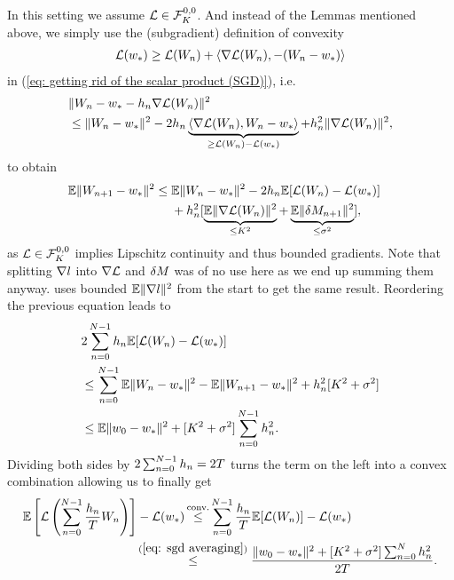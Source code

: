 In this setting we assume \(\Loss \in \lipGradientSet[0,0]{\lipConst}\).
And instead of the Lemmas mentioned above, we simply use the
(subgradient) definition of convexity
\begin{align*}
	\Loss(\minimum)
	\ge \Loss(\Weights_n) + 
	\langle\nabla\Loss(\Weights_n), -(\Weights_n - \minimum)\rangle
\end{align*}
in (\ref{eq: getting rid of the scalar product (SGD)}), i.e.
\begin{align*}
	&\|\Weights_n - \minimum - \lr_n\nabla\Loss(\Weights_n)\|^2\\
	&\le \|\Weights_n - \minimum\|^2
	- 2\lr_n\underbrace{\langle\nabla\Loss(\Weights_n), \Weights_n-\minimum\rangle}_{
		\ge \Loss(\Weights_n) - \Loss(\minimum)
	}
	+ \lr_n^2 \|\nabla\Loss(\Weights_n)\|^2,
\end{align*}
to obtain
\begin{align*}
	\E\|\Weights_{n+1}-\minimum\|^2
	&\le
	\begin{aligned}[t]
		&\E\|\Weights_n -\minimum\|^2
		- 2\lr_n \E[\Loss(\Weights_n) - \Loss(\minimum)]\\
		&+ \lr_n^2 [
			\underbrace{\E\|\nabla\Loss(\Weights_n)\|^2}_{\le \lipConst^2}
			+ \underbrace{\E\|\martIncr_{n+1}\|^2}_{\le \stdBound^2}
		],
	\end{aligned}
\end{align*}
as \(\Loss\in\lipGradientSet[0,0]{\lipConst}\) implies Lipschitz continuity and thus bounded
gradients. Note that splitting \(\nabla\loss\) into \(\nabla\Loss\) and \(\martIncr\)
was of no use here as we end up summing them anyway. \textcite{nemirovskiRobustStochasticApproximation2009}
uses bounded \(\E\|\nabla\loss\|^2\) from the start to get the same result.
Reordering the previous equation leads to
\begin{align}
	\nonumber
	&2\sum_{n=0}^{N-1} \lr_n\E[\Loss(\Weights_n)-\Loss(\minimum)]\\
	\nonumber
	&\le \sum_{n=0}^{N-1} \E\|\Weights_n -\minimum\|^2 - \E\|\Weights_{n+1}-\minimum\|^2
	+ \lr_n^2 [\lipConst^2 + \stdBound^2]\\
	\label{eq: sgd averaging}
	&\le \E\|\weights_0 - \minimum\|^2 + [\lipConst^2+\stdBound^2]\sum_{n=0}^{N-1} \lr_n^2.
\end{align}
Dividing both sides by \(2\sum_{n=0}^{N-1}\lr_n=2T\) turns the term on the left
into a convex combination allowing us to finally get 
\begin{align*}
	\E\left[\Loss\left(\sum_{n=0}^{N-1} \frac{\lr_n}{T}\Weights_n\right)\right]-\Loss(\minimum)
	&\xle{\text{conv.}} \sum_{n=0}^{N-1} \frac{\lr_n}{T}\E[\Loss(\Weights_n)]-\Loss(\minimum)\\
	&\lxle{(\ref{eq: sgd averaging})} \frac{
		\|\weights_0 - \minimum\|^2 + [\lipConst^2+\stdBound^2]\sum_{n=0}^N \lr_n^2
	}{
		2T
	}.
\end{align*}

